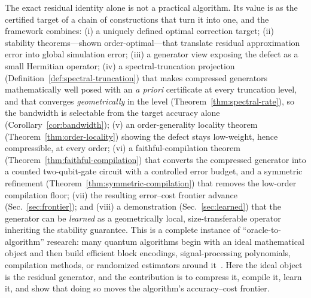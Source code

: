 \documentclass[aps,prxquantum,reprint,superscriptaddress,nofootinbib,amsmath,amssymb]{revtex4-2}
\begin{document}
The exact residual identity alone is not a practical algorithm. Its value is as the certified target of a chain of constructions that turn it into one, and the framework combines: (i) a uniquely defined optimal correction target; (ii) stability theorems---shown order-optimal---that translate residual approximation error into global simulation error; (iii) a generator view exposing the defect as a small Hermitian operator; (iv) a spectral-truncation projection (Definition~\ref{def:spectral-truncation}) that makes compressed generators mathematically well posed with an \emph{a priori} certificate at every truncation level, and that converges \emph{geometrically} in the level (Theorem~\ref{thm:spectral-rate}), so the bandwidth is selectable from the target accuracy alone (Corollary~\ref{cor:bandwidth}); (v) an order-generality locality theorem (Theorem~\ref{thm:order-locality}) showing the defect stays low-weight, hence compressible, at every order; (vi) a faithful-compilation theorem (Theorem~\ref{thm:faithful-compilation}) that converts the compressed generator into a counted two-qubit-gate circuit with a controlled error budget, and a symmetric refinement (Theorem~\ref{thm:symmetric-compilation}) that removes the low-order compilation floor; (vii) the resulting error--cost frontier advance (Sec.~\ref{sec:frontier}); and (viii) a demonstration (Sec.~\ref{sec:learned}) that the generator can be \emph{learned} as a geometrically local, size-transferable operator inheriting the stability guarantee. This is a complete instance of ``oracle-to-algorithm'' research: many quantum algorithms begin with an ideal mathematical object and then build efficient block encodings, signal-processing polynomials, compilation methods, or randomized estimators around it~\cite{berry2015prl,low2017qsp,low2019qubitization,childs2022}. Here the ideal object is the residual generator, and the contribution is to compress it, compile it, learn it, and show that doing so moves the algorithm's accuracy--cost frontier.
\end{document}

